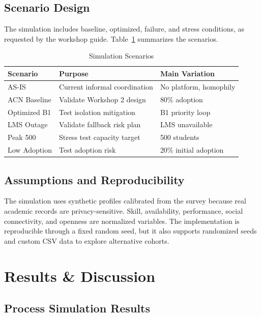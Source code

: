 \documentclass[conference]{IEEEtran}
\begin{document}
\subsection{Scenario Design}

The simulation includes baseline, optimized, failure, and stress conditions, as requested by the workshop guide. Table~\ref{tab:scenarios} summarizes the scenarios.

\begin{table}[htbp]
\caption{Simulation Scenarios}
\label{tab:scenarios}
\centering
\begin{tabular}{p{1.8cm} p{3.0cm} p{2.2cm}}
\toprule
\textbf{Scenario} & \textbf{Purpose} & \textbf{Main Variation} \\
\midrule
AS-IS & Current informal coordination & No platform, homophily \\
ACN Baseline & Validate Workshop 2 design & 80\% adoption \\
Optimized B1 & Test isolation mitigation & B1 priority loop \\
LMS Outage & Validate fallback risk plan & LMS unavailable \\
Peak 500 & Stress test capacity target & 500 students \\
Low Adoption & Test adoption risk & 20\% initial adoption \\
\bottomrule
\end{tabular}
\end{table}

\subsection{Assumptions and Reproducibility}

The simulation uses synthetic profiles calibrated from the survey because real academic records are privacy-sensitive. Skill, availability, performance, social connectivity, and openness are normalized variables. The implementation is reproducible through a fixed random seed, but it also supports randomized seeds and custom CSV data to explore alternative cohorts.

\section{Results \& Discussion}

\subsection{Process Simulation Results}
\end{document}
